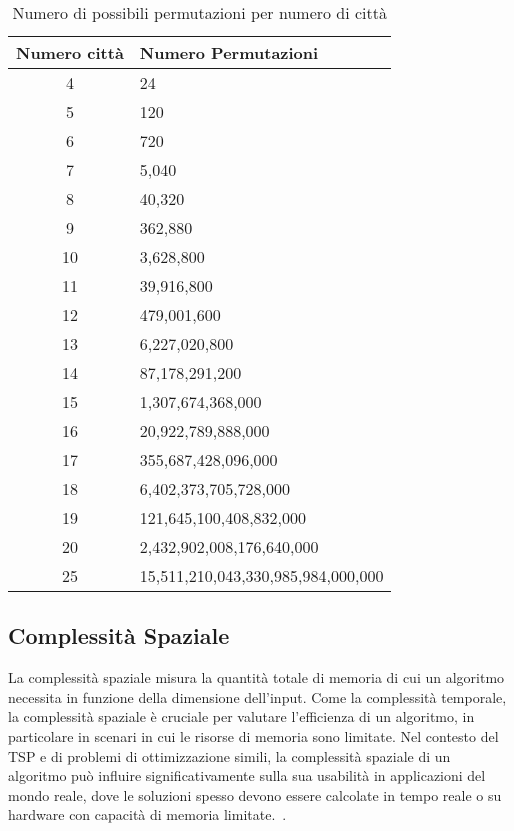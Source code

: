 \begin{table}[h]
	\centering
	\caption{Numero di possibili permutazioni per numero di città}
	\begin{tabular}{c l}
		\toprule
		Numero città & Numero Permutazioni                \\
		\midrule
		4            & 24                                 \\
		5            & 120                                \\
		6            & 720                                \\
		7            & 5,040                              \\
		8            & 40,320                             \\
		9            & 362,880                            \\
		10           & 3,628,800                          \\
		11           & 39,916,800                         \\
		12           & 479,001,600                        \\
		13           & 6,227,020,800                      \\
		14           & 87,178,291,200                     \\
		15           & 1,307,674,368,000                  \\
		16           & 20,922,789,888,000                 \\
		17           & 355,687,428,096,000                \\
		18           & 6,402,373,705,728,000              \\
		19           & 121,645,100,408,832,000            \\
		20           & 2,432,902,008,176,640,000          \\
		25           & 15,511,210,043,330,985,984,000,000 \\
		\bottomrule
	\end{tabular}
\end{table}

\subsection{Complessità Spaziale}

La complessità spaziale misura la quantità totale di memoria di cui un algoritmo necessita in funzione della dimensione dell'input. Come la complessità temporale, la complessità spaziale è cruciale per valutare l'efficienza di un algoritmo, in particolare in scenari in cui le risorse di memoria sono limitate. Nel contesto del \Gls{TSP} e di problemi di ottimizzazione simili, la complessità spaziale di un algoritmo può influire significativamente sulla sua usabilità in applicazioni del mondo reale, dove le soluzioni spesso devono essere calcolate in tempo reale o su hardware con capacità di memoria limitate.~\cite{HeldKarp1962}.

